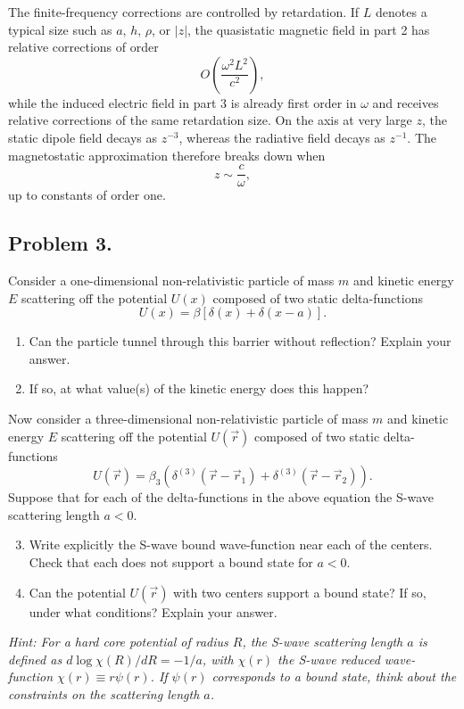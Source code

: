 \begin{solution}
The finite-frequency corrections are controlled by retardation. If $L$ denotes a typical size such as $a$, $h$, $\rho$, or $|z|$, the quasistatic magnetic field in part 2 has relative corrections of order
\[
    O\left(\frac{\omega^2L^2}{c^2}\right),
\]
while the induced electric field in part 3 is already first order in $\omega$ and receives relative corrections of the same retardation size. On the axis at very large $z$, the static dipole field decays as $z^{-3}$, whereas the radiative field decays as $z^{-1}$. The magnetostatic approximation therefore breaks down when
\[
    z\sim \frac{c}{\omega},
\]
up to constants of order one.
\end{solution}

\subsection*{Problem 3.}

\begin{exercise}
\label{physics:2026:3}
Consider a one-dimensional non-relativistic particle of mass $m$ and kinetic energy $E$ scattering off the potential $U(x)$ composed of two static delta-functions
\begin{equation}
    U(x)=\beta[\delta(x)+\delta(x-a)]. \tag{4}
\end{equation}

\begin{enumerate}
    \item Can the particle tunnel through this barrier without reflection? Explain your answer.
    \item If so, at what value(s) of the kinetic energy does this happen?
\end{enumerate}
Now consider a three-dimensional non-relativistic particle of mass $m$ and kinetic energy $E$ scattering off the potential $U(\vec r)$ composed of two static delta-functions
\begin{equation}
    U(\vec r)=\beta_3\left(\delta^{(3)}(\vec r-\vec r_1)+\delta^{(3)}(\vec r-\vec r_2)\right). \tag{5}
\end{equation}
Suppose that for each of the delta-functions in the above equation the S-wave scattering length $a<0$.
\begin{enumerate}
    \setcounter{enumi}{2}
    \item Write explicitly the S-wave bound wave-function near each of the centers. Check that each does not support a bound state for $a<0$.
    \item Can the potential $U(\vec r)$ with two centers support a bound state? If so, under what conditions? Explain your answer.
\end{enumerate}
\textit{Hint: For a hard core potential of radius $R$, the S-wave scattering length $a$ is defined as $d\log\chi(R)/dR=-1/a$, with $\chi(r)$ the S-wave reduced wave-function $\chi(r)\equiv r\psi(r)$. If $\psi(r)$ corresponds to a bound state, think about the constraints on the scattering length $a$.}
\end{exercise}

